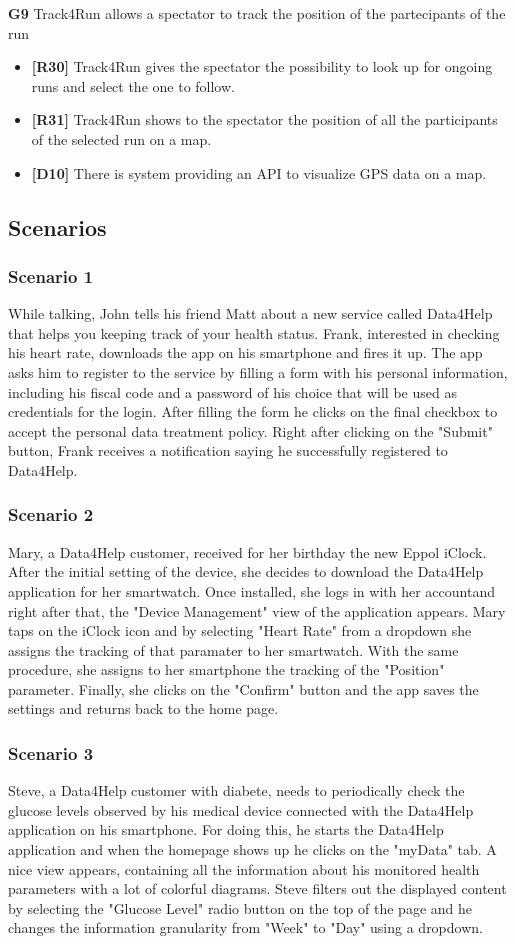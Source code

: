 \textbf{G9} Track4Run allows a spectator to track the position of the partecipants of the run
\begin{itemize}
\item \textbf{[R30]} Track4Run gives the spectator the possibility to look up for ongoing runs and select the one to follow.
\item \textbf{[R31]} Track4Run shows to the spectator the position of all the participants of the selected run on a map.
\item \textbf{[D10]} There is system providing an API to visualize GPS data on a map.
\end{itemize}


\subsection{Scenarios}
\subsubsection{Scenario 1}
While talking, John tells his friend Matt about a new service called Data4Help that helps you keeping track of your health status. Frank, interested in checking his heart rate, downloads the app on his smartphone and fires it up. The app asks him to register to the service by filling a form with his personal information, including his fiscal code and a password of his choice that will be used as credentials for the login. 
After filling the form he clicks on the final checkbox to accept the personal data treatment policy.
Right after clicking on the "Submit" button, Frank receives a notification saying he successfully registered to Data4Help.
\subsubsection{Scenario 2}
Mary, a Data4Help customer, received for her birthday the new Eppol iClock. After the initial setting of the device, she decides to download the Data4Help application for her smartwatch. Once installed, she logs in with her accountand right after that, the "Device Management"
 view of the application appears. Mary taps on the iClock icon and by selecting "Heart Rate" from a dropdown she assigns the tracking of that paramater to her smartwatch. With the same procedure, she assigns to her smartphone the tracking of the "Position" parameter.
Finally, she clicks on the "Confirm" button and the app saves the settings and returns back to the home page.
\subsubsection{Scenario 3}
Steve, a Data4Help customer with diabete, needs to periodically check the glucose levels observed by his medical device connected with the Data4Help application on his smartphone. For doing this, he starts the Data4Help application and when the homepage shows up he  clicks on the "myData" tab. A nice view appears, containing all the information about his monitored health parameters with a lot of colorful diagrams. Steve filters out the displayed content by selecting the "Glucose Level" radio button on the top of the page and he changes the information granularity from "Week" to "Day" using a dropdown.  
